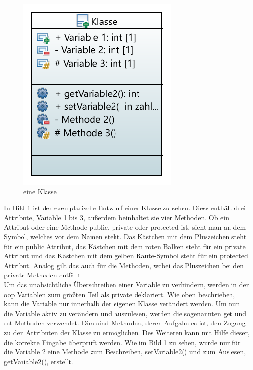 \begin{figure}[H]
	\centering
	\includegraphics[scale=1]{bilder/pdfvorlagen/model}
	
	\caption[eine Klasse]{eine Klasse}
	\label{fig:eineklasse}
\end{figure}
 In Bild  \ref{fig:eineklasse} ist der exemplarische Entwurf einer Klasse zu sehen. Diese enthält drei Attribute, Variable 1 bis 3, außerdem beinhaltet sie vier Methoden. Ob ein Attribut oder eine Methode \glqq public\grqq{},  \glqq private\grqq{} oder \glqq protected\grqq{} ist, sieht man an dem Symbol, welches vor dem Namen steht. Das Kästchen mit dem Pluszeichen steht für ein \glqq public\grqq{} Attribut, das Kästchen mit dem roten Balken steht für ein   \glqq private\grqq{} Attribut und das Kästchen mit dem gelben Raute-Symbol steht für ein \glqq protected\grqq{} Attribut. Analog gilt das auch für die Methoden, wobei das Pluszeichen bei den \glqq private\grqq{} Methoden entfällt. \\
 Um das unabsichtliche Überschreiben einer Variable zu verhindern, werden in der \acs{oop} Variablen zum größten Teil als \glqq private\grqq{} deklariert. Wie oben beschrieben, kann die Variable nur innerhalb der eigenen Klasse verändert werden. Um nun die Variable aktiv zu verändern und auszulesen, werden die sogenannten \glqq get\grqq{} und \glqq set\grqq{} Methoden verwendet. Dies sind Methoden, deren Aufgabe es ist, den Zugang zu den Attributen der Klasse zu ermöglichen. Des Weiteren kann mit Hilfe dieser, die korrekte Eingabe überprüft werden. Wie im Bild \ref{fig:eineklasse} zu sehen, wurde nur für die Variable 2 eine Methode zum Beschreiben, \glqq setVariable2()\grqq{} und zum Auslesen, \glqq getVariable2()\grqq{}, erstellt.\\
